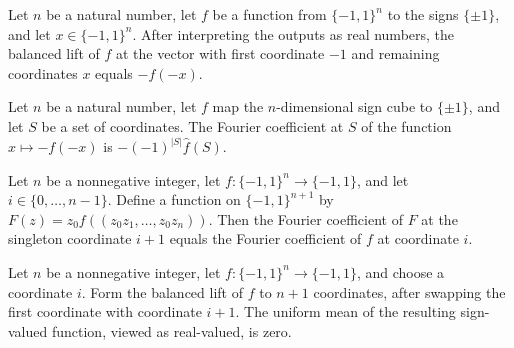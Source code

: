 \begin{theorem}
\label{FABL.balancedFKNLift_toReal_fin_cons_neg_one'}
\leanok
{}
Let $n$ be a natural number, let $f$ be a function from $\{-1,1\}^n$ to the signs
$\{\pm1\}$, and let $x\in\{-1,1\}^n$. After interpreting the outputs as real
numbers, the balanced lift of $f$ at the vector with first coordinate $-1$ and remaining
coordinates $x$ equals $-f(-x)$.
\end{theorem}

\begin{theorem}
\label{FABL.fourierCoeff_negatedInput_toReal'}
\leanok
{}
Let $n$ be a natural number, let $f$ map the $n$-dimensional sign cube to $\{\pm1\}$,
and let $S$ be a set of coordinates. The Fourier coefficient at $S$ of the function
$x\mapsto -f(-x)$ is $-(-1)^{|S|}\widehat f(S)$.
\end{theorem}

\begin{theorem}
\label{FABL.fourierCoeff_balancedFKNLift_succ'}
\leanok
{}
Let $n$ be a nonnegative integer, let $f:\{-1,1\}^n\to\{-1,1\}$, and let
$i\in\{0,\ldots,n-1\}$. Define a function on $\{-1,1\}^{n+1}$ by $F(z)=z_0
f((z_0z_1,\ldots,z_0z_n))$. Then the Fourier coefficient of $F$ at the singleton
coordinate $i+1$ equals the Fourier coefficient of $f$ at coordinate $i$.
\end{theorem}

\begin{theorem}
\label{FABL.mean_improvedFKNBalancedLift}
\leanok
{}
Let $n$ be a nonnegative integer, let $f:\{−1,1\}^n\to\{−1,1\}$, and choose a coordinate
$i$. Form the balanced lift of $f$ to $n+1$ coordinates, after swapping the first
coordinate with coordinate $i+1$. The uniform mean of the resulting sign-valued
function, viewed as real-valued, is zero.
\end{theorem}


